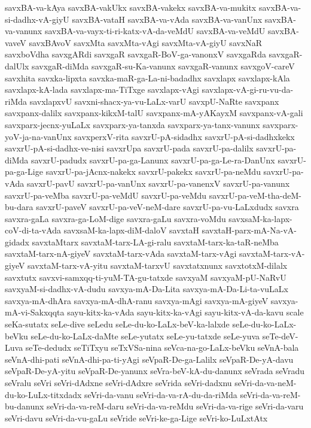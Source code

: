 {savxBA-va-kAya
savxBA-vakUkx
savxBA-vakekx
savxBA-va-mukitx
savxBA-va-si-dadhx-vA-giyU
savxBA-vataH
savxBA-va-vAda
savxBA-va-vanUnx
savxBA-va-vanunx
savxBA-va-vayx-ti-ri-katx-vA-da-veMdU
savxBA-va-veMdU
savxBA-vaveV
savxBAvoV
savxMta
savxMta-vAgi
savxMta-vA-giyU
savxNaR
savxboVdha
savxgARdi
savxgaR
savxgaR-BoV-ga-vanonxV
savxgaRda
savxgaR-dalUlx
savxgaR-diMda
savxgaR-su-Ka-vanunx
savxgaR-vanunx
savxgoV-careV
savxhita
savxka-lipxta
savxka-maR-ga-La-ni-badadhx
savxlapx
savxlapx-kAla
savxlapx-kA-lada
savxlapx-ma-TiTxge
savxlapx-vAgi
savxlapx-vA-gi-ru-vu-da-riMda
savxlapxvU
savxni-shacx-ya-vu-LaLx-varU
savxpU-NaRte
savxpanx
savxpanx-dalilx
savxpanx-kikxM-talU
savxpanx-mA-yAKayxM
savxpanx-vA-gali
savxparx-jecnx-yuLaLx
savxparx-ya-tanxda
savxparx-ya-tanx-vanunx
savxparx-yoV-ja-na-vanUnx
savxperxV-rita
savxrU-pA-sidadhx
savxrU-pA-si-dadhxkekx
savxrU-pA-si-dadhx-ve-nisi
savxrUpa
savxrU-pada
savxrU-pa-dalilx
savxrU-pa-diMda
savxrU-padudx
savxrU-pa-ga-Lanunx
savxrU-pa-ga-Le-ra-DanUnx
savxrU-pa-ga-Lige
savxrU-pa-jAcnx-nakekx
savxrU-pakekx
savxrU-pa-neMdu
savxrU-pa-vAda
savxrU-pavU
savxrU-pa-vanUnx
savxrU-pa-vanenxV
savxrU-pa-vanunx
savxrU-pa-veMba
savxrU-pa-veMdU
savxrU-pa-veMdu
savxrU-pa-veM-tha-deM-bu-dara
savxrU-paveV
savxrU-pa-veV-neM-dare
savxrU-pa-vu-LaLxdudx
savxra
savxra-gaLa
savxra-ga-LoM-dige
savxra-gaLu
savxra-voMdu
savxsaM-ka-lapx-coV-di-ta-vAda
savxsaM-ka-lapx-diM-daloV
savxtaH
savxtaH-parx-mA-Na-vA-gidadx
savxtaMtarx
savxtaM-tarx-LA-gi-ralu
savxtaM-tarx-ka-taR-neMba
savxtaM-tarx-nA-giyeV
savxtaM-tarx-vAda
savxtaM-tarx-vAgi
savxtaM-tarx-vA-giyeV
savxtaM-tarx-vA-yitu
savxtaM-tarxvU
savxtatxnunx
savxtotxM-dilalx
savxtutx
savxvi-samxqq-ti-yuM-TA-gu-tatxde
savxyaM
savxyaM-pU-NaRvU
savxyaM-si-dadhx-vA-dudu
savxya-mA-Da-Lita
savxya-mA-Da-Li-ta-vuLaLx
savxya-mA-dhAra
savxya-mA-dhA-ranu
savxya-mAgi
savxya-mA-giyeV
savxya-mA-vi-Sakxqqta
sayu-kitx-ka-vAda
sayu-kitx-ka-vAgi
sayu-kitx-vA-da-kavu
scale
seKa-sutatx
seLe-dive
seLedu
seLe-du-ko-LaLx-beV-ka-lalxde
seLe-du-ko-LaLx-beVku
seLe-du-ko-LaLx-daMte
seLe-yutatx
seLe-yu-tatxde
seLe-yuva
seTe-deV-Luva
seTe-dedudx
seTiTxyu
seTxVSa-nina
seVca-na-go-LaLx-beVku
seVnA-bala
seVnA-dhi-pati
seVnA-dhi-pa-ti-yAgi
seVpaR-De-ga-Lalilx
seVpaR-De-yA-davu
seVpaR-De-yA-yitu
seVpaR-De-yanunx
seVra-beV-kA-du-danunx
seVrada
seVradu
seVralu
seVri
seVri-dAdxne
seVri-dAdxre
seVrida
seVri-dadxnu
seVri-da-va-neM-du-ko-LuLx-titxdadx
seVri-da-vanu
seVri-da-va-rA-du-da-riMda
seVri-da-va-reM-bu-danunx
seVri-da-va-reM-daru
seVri-da-va-reMdu
seVri-da-va-rige
seVri-da-varu
seVri-davu
seVri-da-vu-gaLu
seVride
seVri-ke-ga-Lige
seVri-ko-LuLxtAtx
}
